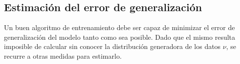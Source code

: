 %
%
\subsection{Estimación del error de generalización}
%
Un buen algoritmo de entrenamiento debe ser capaz de minimizar el
error de generalización del modelo tanto como sea posible.
Dado que el mismo resulta imposible de calcular sin conocer la
distribución generadora de los datos $\nu$, se recurre a otras
medidas para estimarlo.
